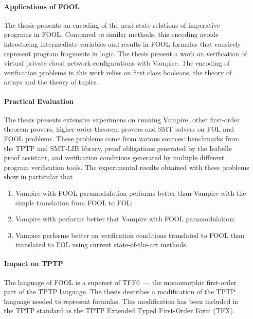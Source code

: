 \paragraph{Applications of FOOL}
The thesis presents an encoding of the next state relations of imperative programs in FOOL. Compared to similar methods, this encoding avoids introducing intermediate variables and results in FOOL formulas that consicely represent program fragments in logic.
The thesis present a work on verification of virtual private cloud network configurations with Vampire. The encoding of verification problems in this work relies on first class booleans, the theory of arrays and the theory of tuples.

\paragraph{Practical Evaluation}
The thesis presents extensive experimens on running Vampire, other first-order theorem provers, higher-order theorem provers and SMT solvers on FOL and FOOL problems. These problems come from various sources: benchmarks from the TPTP and SMT-LIB library, proof obligations generated by the Isabelle proof assistant, and verification conditions generated by multiple different program verification tools. The experimental results obtained with these problems show in particular that \begin{enumerate}
  \item Vampire with FOOL paramodulation performs better than Vampire with the simple translation from FOOL to FOL;
  \item Vampire with \nfcnf{} performs better that Vampire with FOOL paramodulation;
  \item Vampire performs better on verification conditions translated to FOOL than translated to FOL using current state-of-the-art methods.
\end{enumerate}

\paragraph{Impact on TPTP}
The language of FOOL is a superset of TFF0~--- the monomorphic first-order part of the TPTP language. The thesis describes a modification of the TPTP language needed to represent \folb{} formulas. This modification has been included in the TPTP standard as the TPTP Extended Typed First-Order Form (TFX).


